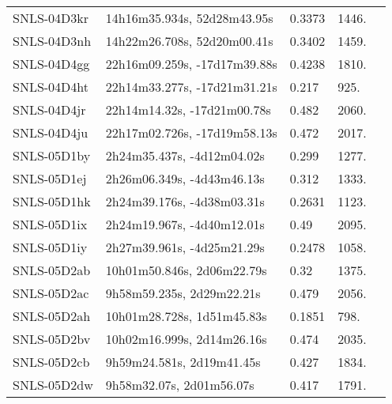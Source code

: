 \begin{longtable}{lllll}
      SNLS-04D3kr &    14h16m35.934s, 52d28m43.95s &   0.3373 &          1446. &    \citet{2005ApJ...634.1190H} \\
      SNLS-04D3nh &    14h22m26.708s, 52d20m00.41s &   0.3402 &          1459. &    \citet{2005ApJ...634.1190H} \\
      SNLS-04D4gg &   22h16m09.259s, -17d17m39.88s &   0.4238 &          1810. &    \citet{2005ApJ...634.1190H} \\
      SNLS-04D4ht &   22h14m33.277s, -17d21m31.21s &    0.217 &           925. &  \citet{2009AandA...507...85B} \\
      SNLS-04D4jr &    22h14m14.32s, -17d21m00.78s &    0.482 &          2060. &    \citet{2008ApJ...674...51E} \\
      SNLS-04D4ju &   22h17m02.726s, -17d19m58.13s &    0.472 &          2017. &  \citet{2009AandA...507...85B} \\
      SNLS-05D1by &     2h24m35.437s, -4d12m04.02s &    0.299 &          1277. &    \citet{2008AJ....135.1343G} \\
      SNLS-05D1ej &     2h26m06.349s, -4d43m46.13s &    0.312 &          1333. &  \citet{2008AandA...477..717B} \\
      SNLS-05D1hk &     2h24m39.176s, -4d38m03.31s &   0.2631 &          1123. &    \citet{2008ApJ...674...51E} \\
      SNLS-05D1ix &     2h24m19.967s, -4d40m12.01s &     0.49 &          2095. &    \citet{2008ApJ...674...51E} \\
      SNLS-05D1iy &     2h27m39.961s, -4d25m21.29s &   0.2478 &          1058. &    \citet{2008ApJ...674...51E} \\
      SNLS-05D2ab &     10h01m50.846s, 2d06m22.79s &     0.32 &          1375. &    \citet{2006AJ....132.1126N} \\
      SNLS-05D2ac &      9h58m59.235s, 2d29m22.21s &    0.479 &          2056. &  \citet{2009AandA...507...85B} \\
      SNLS-05D2ah &     10h01m28.728s, 1d51m45.83s &   0.1851 &           798. &    \citet{2007ApJS..172...70L} \\
      SNLS-05D2bv &     10h02m16.999s, 2d14m26.16s &    0.474 &          2035. &  \citet{2009AandA...507...85B} \\
      SNLS-05D2cb &      9h59m24.581s, 2d19m41.45s &    0.427 &          1834. &  \citet{2009AandA...507...85B} \\
      SNLS-05D2dw &       9h58m32.07s, 2d01m56.07s &    0.417 &          1791. &  \citet{2009AandA...507...85B} \\

\end{longtable}
